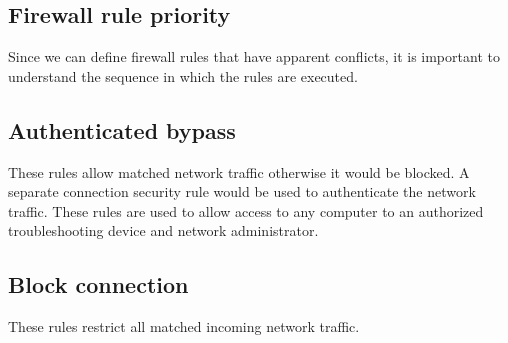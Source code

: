 \subsection{Firewall rule priority}
Since we can define firewall rules that have apparent conflicts, it is important to understand the sequence in which the rules are executed.
\subsection{Authenticated bypass}
 These rules allow matched network traffic otherwise it would be blocked. A separate connection security rule would be used to authenticate the network traffic. These rules are used to allow access to any computer to an authorized troubleshooting device and network administrator.
\subsection{Block connection}
       These rules restrict all matched incoming network traffic.
